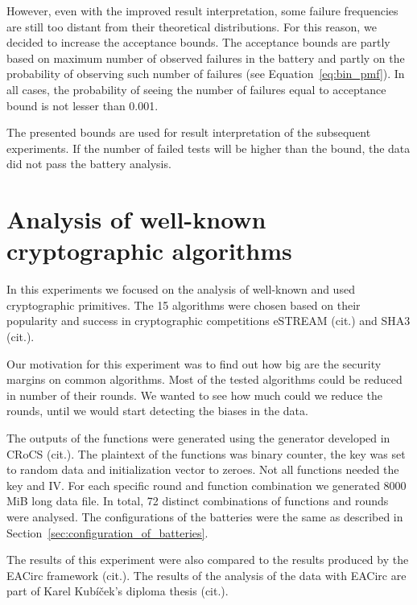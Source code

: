 \documentclass[
  digital,  	%
  color,		%
  oneside,   	%
  12pt,
  nocover,
  notable,
  nolof,
  nolot,
]{fithesis3}
\theoremstyle{definition}
\theoremstyle{remark}
\begin{document}
However, even with the improved result interpretation, some failure frequencies are still too distant from their theoretical distributions. For this reason, we decided to increase the acceptance bounds. The acceptance bounds are partly based on maximum number of observed failures in the battery and partly on the probability of observing such number of failures (see Equation~\ref{eq:bin_pmf}). In all cases, the probability of seeing the number of failures equal to acceptance bound is not lesser than 0.001.

The presented bounds are used for result interpretation of the subsequent experiments. If the number of failed tests will be higher than the bound, the data did not pass the battery analysis. 

\section{Analysis of well-known cryptographic algorithms}
In this experiments we focused on the analysis of well-known and used cryptographic primitives. The 15 algorithms were chosen based on their popularity and success in cryptographic competitions eSTREAM (cit.) and SHA3 (cit.).

Our motivation for this experiment was to find out how big are the security margins on common algorithms. Most of the tested algorithms could be reduced in number of their rounds. We wanted to see how much could we reduce the rounds, until we would start detecting the biases in the data.

The outputs of the functions were generated using the generator developed in CRoCS (cit.). The plaintext of the functions was binary counter, the key was set to random data and initialization vector to zeroes. Not all functions needed the key and IV. For each specific round and function combination we generated 8000 MiB long data file. In total, 72 distinct combinations of functions and rounds were analysed. The configurations of the batteries were the same as described in Section~\ref{sec:configuration_of_batteries}. 

The results of this experiment were also compared to the results produced by the EACirc framework (cit.). The results of the analysis of the data with EACirc are part of Karel Kubíček's diploma thesis (cit.).
\end{document}
